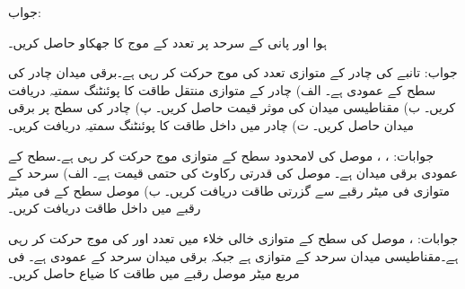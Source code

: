 جواب:

ہوا اور پانی  کے سرحد پر  تعدد کے موج کا جھکاو حاصل کریں۔

جواب:
تانبے کی چادر کے متوازی  تعدد کی موج حرکت کر رہی ہے۔برقی میدان  چادر کی سطح کے عمودی ہے۔ الف) چادر کے متوازی منتقل طاقت کا پوئنٹنگ سمتیہ دریافت کریں۔ ب) مقناطیسی میدان کی موثر قیمت حاصل کریں۔ پ) چادر کی سطح پر برقی میدان حاصل کریں۔ ت) چادر میں داخل طاقت کا پوئنٹنگ سمتیہ دریافت کریں۔

جوابات: ، ،  
موصل کی لامحدود سطح کے متوازی موج حرکت کر رہی ہے۔سطح کے عمودی برقی میدان  ہے۔ موصل کی قدرتی رکاوٹ کی حتمی قیمت  ہے۔ الف) سرحد کے متوازی فی میٹر رقبے سے گزرتی طاقت دریافت کریں۔ ب) موصل سطح کے فی میٹر رقبے میں داخل طاقت دریافت کریں۔

جوابات: ، 
موصل  کی سطح  کے متوازی خالی خلاء میں  تعدد
 اور  کی موج  حرکت کر رہی ہے۔مقناطیسی میدان سرحد کے متوازی ہے جبکہ برقی میدان سرحد کے عمودی ہے۔ فی مربع میٹر موصل رقبے میں طاقت کا ضیاع حاصل کریں۔

